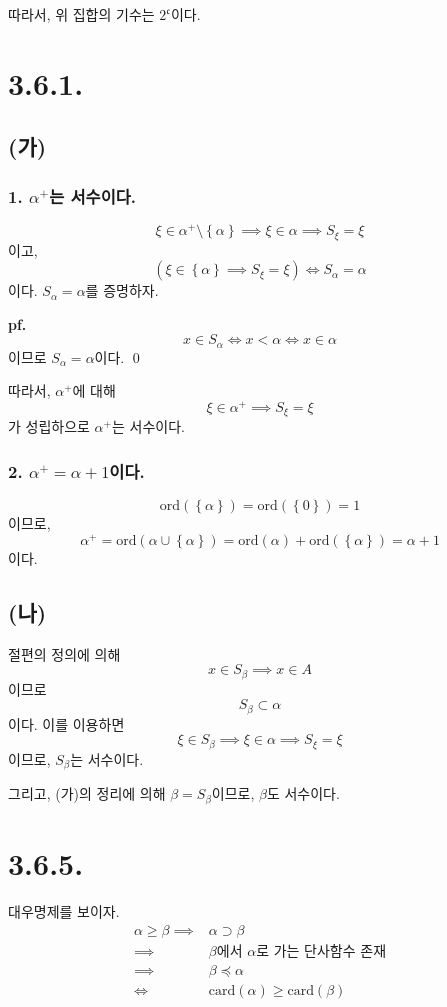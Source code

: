 \documentclass{article}
\begin{document}
따라서, 위 집합의 기수는 $2^{\mathfrak{c}}$이다.

\section{3.6.1.}
\subsection{(가)}
\subsubsection{1. $\alpha^+$는 서수이다.}
$$\xi \in \alpha^+ \setminus \left\{\alpha \right\} \implies \xi \in \alpha \implies S_{\xi} = \xi$$
이고,
$$\left( \xi \in \left\{\alpha \right\} \implies  S_{\xi} = \xi \right) \iff  S_\alpha = \alpha$$
이다. $S_\alpha = \alpha$를 증명하자.

\textbf{pf.}
$$x \in S_\alpha \iff x < \alpha \iff x \in \alpha$$
이므로 $S_\alpha = \alpha$이다. \qed

따라서, $\alpha^+$에 대해
$$\xi \in \alpha^+  \implies  S_{\xi} = \xi$$
가 성립하으로 $\alpha^+$는 서수이다.


\subsubsection{2. $\alpha^+ = \alpha + 1$이다.}
$$\text{ord}(\left\{\alpha\right\}) = \text{ord}(\left\{0\right\}) = 1$$
이므로,
$$\alpha^+ = \text{ord}(\alpha \cup \left\{\alpha\right\}) = \text{ord}(\alpha) + \text{ord}(\left\{\alpha\right\}) = \alpha + 1$$이다.

\subsection{(나)}

절편의 정의에 의해 
$$x \in S_\beta \implies x \in A$$이므로
$$S_\beta \subset \alpha$$이다. 이를 이용하면
$$\xi \in S_\beta \implies \xi \in \alpha  \implies  S_{\xi} = \xi$$
이므로, $S_\beta$는 서수이다.

그리고, (가)의 정리에 의해 $\beta = S_\beta$이므로, $\beta$도 서수이다.


\section{3.6.5.}
대우명제를 보이자.
\begin{align*}
\alpha \ge \beta \implies& \alpha \supset \beta
\\ \implies& \text{$\beta$에서 $\alpha$로 가는 단사함수 존재}
\\ \implies& \beta \preceq \alpha
\\ \iff& \text{card}(\alpha) \ge \text{card}(\beta)
\end{align*}
\end{document}
